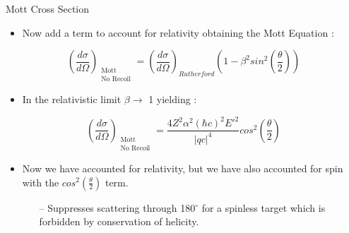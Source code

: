 \documentclass[10pt]{beamer}
\begin{document}
\begin{frame}[fragile]{Mott Cross Section}
    		\begin{itemize}
    			\item Now add a term to account for relativity obtaining the \alert{Mott Equation} \cite{Book:Povh}:
    		\end{itemize}
    		\begin{equation} \label{eq:mott_no_recoil}
			\left(\frac{d\sigma}{d\Omega}\right)_{\substack{ \text{Mott} \\ \text{No Recoil}}} = 	\left(\frac{d\sigma}{d\Omega}\right)_{Rutherford} \left( 1-\beta^2 sin^2 \left( \frac{\theta}{2} \right) \right)
		\end{equation}
  		\pause
      	\begin{itemize}
    			\item In the relativistic limit \alert{$\beta \rightarrow$ 1} yielding \cite{Book:Povh}:
    		\end{itemize}
    		\begin{equation} \label{eq:mott_no_recoil_simple}
	\left(\frac{d\sigma}{d\Omega}\right)_{\substack{ \text{Mott} \\ \text{No Recoil}}} = \frac{4Z^2\alpha^2\left(\hbar c\right)^2E'^2}{|qc|^4} cos^2 \left( \frac{\theta}{2} \right) 
		\end{equation}
		\pause
    		\begin{itemize}
    			\item Now we have accounted for relativity, \alert{but we have also accounted for spin} with the $cos^2 \left( \frac{\theta}{2} \right)$ term.
    			\begin{itemize}
    				\item[--] Suppresses scattering through 180$^{\circ}$ for a spinless target which is forbidden by conservation of helicity.
			\end{itemize}    			 
    		\end{itemize}
\end{frame}
\end{document}
